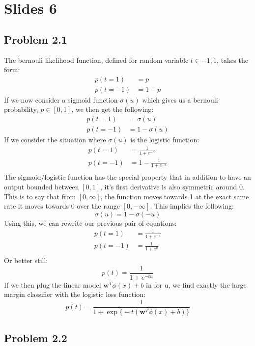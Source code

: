 \documentclass[a4paper,12pt]{article}\usepackage[]{graphicx}\usepackage[]{color}
\begin{document}
\section*{Slides 6}

\subsection*{Problem 2.1}

The bernouli likelihood function, defined for random variable $t \in {-1,1}$, takes the form:
%
\begin{align*}
p(t = 1) &= p \\
p(t = -1) &= 1 - p
\end{align*}
%
If we now consider a sigmoid function $\sigma(u)$ which gives us a bernouli probability, $p \in [0,1]$, we then get the following:
%
\begin{align*}
p(t = 1) &= \sigma(u) \\
p(t = -1) &= 1 - \sigma(u)
\end{align*}
%
If we consider the situation where $\sigma(u)$ is the logistic function:
%
\begin{align*}
p(t = 1) &= \frac{1}{1 + e^{-u}} \\
p(t = -1) &= 1 - \frac{1}{1 + e^{-u}} \\
\end{align*}
%
The sigmoid/logistic function has the special property that in addition to have an output bounded between $[0,1]$, it's first derivative is also symmetric around 0. This is to say that from $[0, \infty]$, the function moves towards 1 at the exact same rate it moves towards 0 over the range $[0, -\infty]$. This implies the following:
%
$$
\sigma(u) = 1 - \sigma(-u)
$$
%
Using this, we can rewrite our previous pair of equations:
%
\begin{align*}
p(t = 1) &= \frac{1}{1 + e^{-u}} \\
p(t = -1) &= \frac{1}{1 + e^{u}} \\
\end{align*}
%
Or better still:
$$
p(t) = \frac{1}{1 + e^{-tu}}
$$
If we then plug the linear model $\bm{w}^T\phi(x) + b$ in for u, we find exactly the large margin classifier with the logistic loss function:
%
$$
p(t) = \frac{1}{1 + \exp \Big\{ -t(\bm{w}^T\phi(x) + b) \Big\} }
$$

\subsection*{Problem 2.2}
\end{document}
